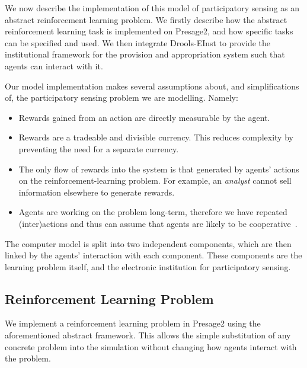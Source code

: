 We now describe the implementation of this model of participatory sensing as an abstract reinforcement learning problem. We firstly describe how the abstract reinforcement learning task is implemented on Presage2, and how specific tasks can be specified and used. We then integrate Drools-EInst to provide the institutional framework for the provision and appropriation system such that agents can interact with it. 

Our model implementation makes several assumptions about, and simplifications of, the participatory sensing problem we are modelling. Namely:

\begin{itemize}
\item Rewards gained from an action are directly measurable by the agent.
\item Rewards are a tradeable and divisible currency. This reduces complexity by preventing the need for a separate currency.
\item The only flow of rewards into the system is that generated by agents' actions on the reinforcement-learning problem. For example, an \emph{analyst} cannot sell information elsewhere to generate rewards.
\item Agents are working on the problem long-term, therefore we have repeated (inter)actions and thus can assume that agents are likely to be cooperative~\citep{Axelrod1984}.
\end{itemize}

The computer model is split into two independent components, which are then
linked by the agents' interaction with each component. These components are
the learning problem itself, and the electronic institution for participatory
sensing.

\subsection{Reinforcement Learning Problem}

We implement a reinforcement learning problem in Presage2 using the
aforementioned abstract framework. This allows the simple substitution of any
concrete problem into the simulation without changing how agents interact with
the problem.

